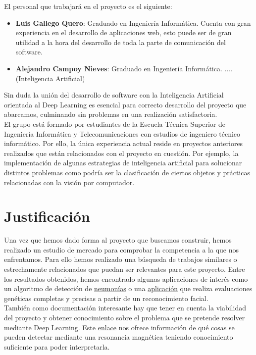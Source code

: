 El personal que trabajará en el proyecto es el siguiente:
\begin{itemize}
	\item \textbf{Luis Gallego Quero}: Graduado en Ingeniería Informática. Cuenta con gran experiencia en el desarrollo de aplicaciones web, esto puede ser de gran utilidad a la hora del desarrollo de toda la parte de comunicación del software.
	\item \textbf{Alejandro Campoy Nieves}:  Graduado en Ingeniería Informática. .... (Inteligencia Artificial)
\end{itemize}

Sin duda la unión del desarrollo de software con la Inteligencia Artificial orientada al Deep Learning es esencial para correcto desarrollo del proyecto que abarcamos, culminando sin problemas en una realización satisfactoria. \\

El grupo está formado por estudiantes de la Escuela Técnica Superior de Ingeniería Informática y Telecomunicaciones con estudios de ingeniero técnico informático. Por ello, la única experiencia actual reside en proyectos anteriores realizados que están relacionados con el proyecto en cuestión. Por ejemplo, la implementación de algunas estrategias de inteligencia artificial para solucionar distintos problemas como podría ser la clasificación de ciertos objetos y prácticas relacionadas con la visión por computador.

\section{Justificación}

Una vez que hemos dado forma al proyecto que buscamos construir, hemos realizado un estudio de mercado para comprobar la competencia a la que nos enfrentamos. Para ello hemos realizado una búsqueda de trabajos similares o estrechamente relacionados que puedan ser relevantes para este proyecto. Entre los resultados obtenidos, hemos encontrado algunas aplicaciones de interés como un algoritmo de detección de \href{https://blogthinkbig.com/este-algoritmo-diagnostica-neumonia-con-la-precision-de-un-medico}{neumonías} \cite{article:neumonia} o una \href{https://www.face2gene.com/}{aplicación} \cite{misc:face2gene} que realiza evaluaciones genéticas completas y precisas a partir de un reconocimiento facial. \\

También como documentación interesante hay que tener en cuenta la viabilidad del proyecto y obtener conocimiento sobre el problema que se pretende resolver mediante Deep Learning. Este \href{https://blog.hospitalsanangelinn.mx/resonancia-magnetica-diagnostico}{enlace} \cite{article:resonancia} nos ofrece información de qué cosas se pueden detectar mediante una resonancia magnética teniendo conocimiento suficiente para poder interpretarla. \\

